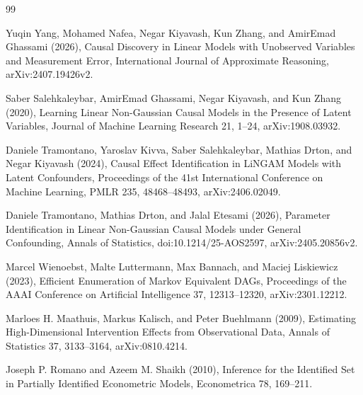 \documentclass{article}
\begin{document}
\begin{thebibliography}{99}

   Yuqin Yang, Mohamed Nafea, Negar Kiyavash, Kun Zhang, and AmirEmad Ghassami (2026), Causal Discovery in Linear Models with Unobserved Variables and Measurement Error, International Journal of Approximate Reasoning, arXiv:2407.19426v2.

   Saber Salehkaleybar, AmirEmad Ghassami, Negar Kiyavash, and Kun Zhang (2020), Learning Linear Non-Gaussian Causal Models in the Presence of Latent Variables, Journal of Machine Learning Research 21, 1--24, arXiv:1908.03932.

   Daniele Tramontano, Yaroslav Kivva, Saber Salehkaleybar, Mathias Drton, and Negar Kiyavash (2024), Causal Effect Identification in LiNGAM Models with Latent Confounders, Proceedings of the 41st International Conference on Machine Learning, PMLR 235, 48468--48493, arXiv:2406.02049.

   Daniele Tramontano, Mathias Drton, and Jalal Etesami (2026), Parameter Identification in Linear Non-Gaussian Causal Models under General Confounding, Annals of Statistics, doi:10.1214/25-AOS2597, arXiv:2405.20856v2.

   Marcel Wienoebst, Malte Luttermann, Max Bannach, and Maciej Liskiewicz (2023), Efficient Enumeration of Markov Equivalent DAGs, Proceedings of the AAAI Conference on Artificial Intelligence 37, 12313--12320, arXiv:2301.12212.

   Marloes H. Maathuis, Markus Kalisch, and Peter Buehlmann (2009), Estimating High-Dimensional Intervention Effects from Observational Data, Annals of Statistics 37, 3133--3164, arXiv:0810.4214.

   Joseph P. Romano and Azeem M. Shaikh (2010), Inference for the Identified Set in Partially Identified Econometric Models, Econometrica 78, 169--211.

\end{thebibliography}
\end{document}
